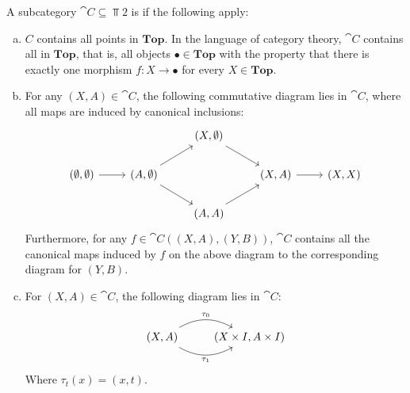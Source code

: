 \begin{definition}
A subcategory $\cat{C}\subseteq \Top{2}$ is  if the following apply:
\begin{enumerate}[(a)]
\item $C$ contains all points in $\mathbf{Top}$. In the language of category theory, $\cat{C}$ contains all  in $\mathbf{Top}$, that is, all objects $\bullet\in\mathbf{Top}$ with the property that there is exactly one morphism $f:X\rightarrow \bullet$ for every $X\in \mathbf{Top}$.
\item For any $(X,A)\in \cat{C}$, the following commutative diagram lies in $\cat{C}$, where all maps are induced by canonical inclusions:
\[\begin{tikzcd}
                                  &                                       & {(X,\emptyset)} \arrow[rd] &                   &         \\
{(\emptyset,\emptyset)} \arrow[r] & {(A,\emptyset)} \arrow[ru] \arrow[rd] &                            & {(X,A)} \arrow[r] & {(X,X)} \\
                                  &                                       & {(A,A)} \arrow[ru]         &                   &        
\end{tikzcd}\]
Furthermore, for any $f\in \cat{C}((X,A),(Y,B))$, $\cat{C}$ contains all the canonical maps induced by $f$ on the above diagram to the corresponding diagram for $(Y,B)$.
\item For $(X,A)\in \cat{C}$, the following diagram lies in $\cat{C}$:
\[\begin{tikzcd}
{(X,A)} \arrow[r, "\tau_1"', bend right] \arrow[r, "\tau_0", bend left] & {(X\times I,A\times I)}
\end{tikzcd}\]
Where $\tau_t(x)=(x,t)$.
\end{enumerate}
\end{definition}

